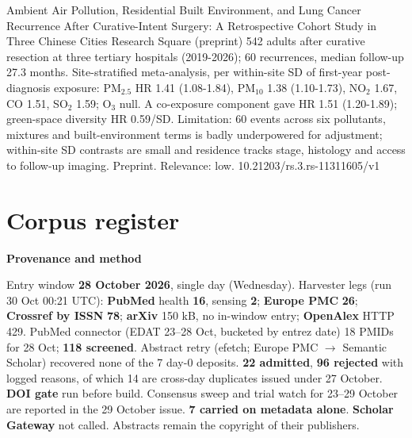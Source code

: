\documentclass[10pt]{article}
\begin{document}
{Ambient Air Pollution, Residential Built Environment, and Lung Cancer Recurrence After Curative-Intent Surgery: A Retrospective Cohort Study in Three Chinese Cities}
{Research Square (preprint)}
{542 adults after curative resection at three tertiary hospitals (2019-2026); 60 recurrences, median follow-up 27.3 months. Site-stratified meta-analysis, per within-site SD of first-year post-diagnosis exposure: PM$_{2.5}$ HR 1.41 (1.08-1.84), PM$_{10}$ 1.38 (1.10-1.73), NO$_2$ 1.67, CO 1.51, SO$_2$ 1.59; O$_3$ null. A co-exposure component gave HR 1.51 (1.20-1.89); green-space diversity HR 0.59/SD. Limitation: 60 events across six pollutants, mixtures and built-environment terms is badly underpowered for adjustment; within-site SD contrasts are small and residence tracks stage, histology and access to follow-up imaging. Preprint. Relevance: low.}
{10.21203/rs.3.rs-11311605/v1}

\clearpage
\section*{\sffamily\bfseries\color{Deep}Corpus register}
\vspace{-1.5mm}{\color{Amber}\rule{\linewidth}{1.1pt}}\vspace{2.5mm}



\vspace{2mm}

\begin{keybox}
{\sffamily\bfseries\footnotesize\color{Deep}Provenance and method}\\[1.2mm]
{\fontsize{7.2}{8.8}\selectfont
Entry window \textbf{28 October 2026}, single day (Wednesday). Harvester legs (run 30 Oct 00:21 UTC):
\textbf{PubMed} health \textbf{16}, sensing \textbf{2}; \textbf{Europe PMC} \textbf{26}; \textbf{Crossref by ISSN}
\textbf{78}; \textbf{arXiv} 150 kB, no in-window entry; \textbf{OpenAlex} HTTP 429. PubMed connector (EDAT 23--28 Oct,
bucketed by entrez date) 18 PMIDs for 28 Oct; \textbf{118 screened}. Abstract retry (efetch; Europe PMC
$\rightarrow$ Semantic Scholar) recovered none of the 7 day-0 deposits. \textbf{22 admitted}, \textbf{96 rejected}
with logged reasons, of which 14 are cross-day duplicates issued under 27 October. \textbf{DOI gate} run before
build. Consensus sweep and trial watch for 23--29 October are reported in the 29 October issue. \textbf{7 carried on
metadata alone}. \textbf{Scholar Gateway} not called. Abstracts remain the copyright of their publishers.\par}
\end{keybox}
\end{document}
